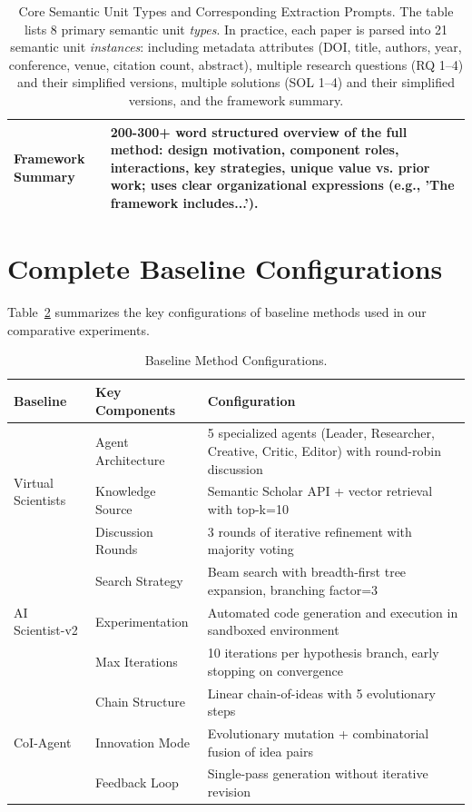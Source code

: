 \documentclass[runningheads]{llncs}
\begin{document}
\begin{table}[h]
\begin{tabular}{p{3.5cm}p{9.5cm}}
\midrule
Framework Summary & 200-300+ word structured overview of the full method: design motivation, component roles, interactions, key strategies, unique value vs. prior work; uses clear organizational expressions (e.g., 'The framework includes...'). \\
\bottomrule
\end{tabular}
\caption{Core Semantic Unit Types and Corresponding Extraction Prompts. The table lists 8 primary semantic unit \textit{types}. In practice, each paper is parsed into 21 semantic unit \textit{instances}: including metadata attributes (DOI, title, authors, year, conference, venue, citation count, abstract), multiple research questions (RQ 1--4) and their simplified versions, multiple solutions (SOL 1--4) and their simplified versions, and the framework summary.}
\label{tab:semantic_prompt_extraction}
\end{table}


\section{Complete Baseline Configurations}
\label{app:baseline_config}

Table~\ref{tab:baseline_configs} summarizes the key configurations of baseline methods used in our comparative experiments.

\begin{table}[h]
\centering
\small
\setlength{\tabcolsep}{4pt}
\begin{tabular}{lp{4cm}p{6cm}}
\toprule
\textbf{Baseline} & \textbf{Key Components} & \textbf{Configuration} \\
\midrule
\multirow{3}{*}{Virtual Scientists} 
 & Agent Architecture & 5 specialized agents (Leader, Researcher, Creative, Critic, Editor) with round-robin discussion \\
 & Knowledge Source & Semantic Scholar API + vector retrieval with top-k=10 \\
 & Discussion Rounds & 3 rounds of iterative refinement with majority voting \\
\midrule
\multirow{3}{*}{AI Scientist-v2} 
 & Search Strategy & Beam search with breadth-first tree expansion, branching factor=3 \\
 & Experimentation & Automated code generation and execution in sandboxed environment \\
 & Max Iterations & 10 iterations per hypothesis branch, early stopping on convergence \\
\midrule
\multirow{3}{*}{CoI-Agent} 
 & Chain Structure & Linear chain-of-ideas with 5 evolutionary steps \\
 & Innovation Mode & Evolutionary mutation + combinatorial fusion of idea pairs \\
 & Feedback Loop & Single-pass generation without iterative revision \\
\bottomrule
\end{tabular}
\caption{Baseline Method Configurations.}
\label{tab:baseline_configs}
\end{table}
\end{document}

